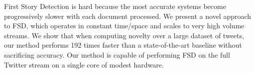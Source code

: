 First Story Detection is hard because the most accurate systems become progressively slower with each document processed. We present a novel approach to FSD, which operates in constant time/space and scales to very high volume streams. We show that when computing novelty over a large dataset of tweets, our method performs 192 times faster than a state-of-the-art baseline without sacrificing accuracy. Our method is capable of performing FSD on the full Twitter stream on a single core of modest hardware.
